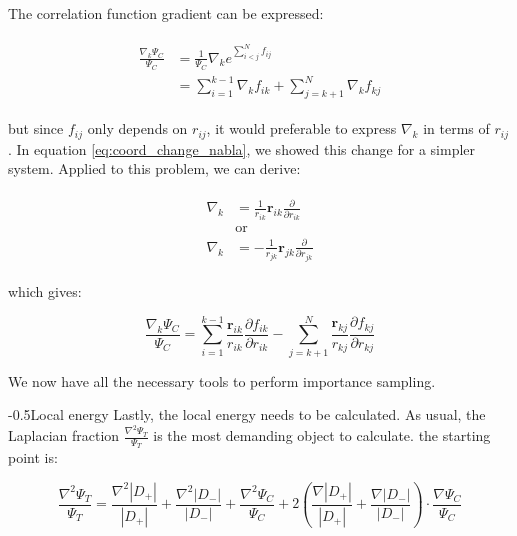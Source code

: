 \documentclass[english, a4paper]{article}
\makeatletter
\renewcommand{\subsubsection}{\@startsection{subsubsection}{3}{0pt}%
{-\baselineskip}{0.5\baselineskip}{\bf\large}}
\newcommand{\bm}[1]{\mathbf{#1}}
\makeatother
\begin{document}
The correlation function gradient can be expressed:

\begin{align}
	\begin{split}
	\frac{\nabla_k \Psi_C}{\Psi_C} &= \frac{1}{\Psi_C}\nabla_k e^{\sum_{i<j}^Nf_{ij}}\\
	&= \sum_{i=1}^{k-1}\nabla_kf_{ik} + \sum_{j=k+1}^{N}\nabla_kf_{kj}
	\end{split}
\end{align}

but since $f_{ij}$ only depends on $r_{ij}$, it would preferable to express $\nabla_k$ in terms of $r_{ij}$. In equation \ref{eq:coord_change_nabla}, we showed this change for a simpler system. Applied to this problem, we can derive:

\begin{align}
	\begin{split}
	\nabla_k &=  \frac{1}{r_{ik}}\bm{r}_{ik}\frac{\partial}{\partial r_{ik}}\\
	&\text{or}\\
	\nabla_k &=  -\frac{1}{r_{jk}}\bm{r}_{jk}\frac{\partial}{\partial r_{jk}}
	\end{split}
\end{align}

which gives:

\begin{equation}
	\frac{\nabla_k \Psi_C}{\Psi_C} = \sum_{i=1}^{k-1}\frac{\bm{r}_{ik}}{r_{ik}}\frac{\partial f_{ik}}{\partial r_{ik}} - \sum_{j=k+1}^{N}\frac{\bm{r}_{kj}}{r_{kj}}\frac{\partial f_{kj}}{\partial r_{kj}}
\end{equation}

We now have all the necessary tools to perform importance sampling.

\subsubsection{Local energy}
Lastly, the local energy needs to be calculated. As usual, the Laplacian fraction $\frac{\nabla^2\Psi_T}{\Psi_T}$ is the most demanding object to calculate. the starting point is:

\begin{equation}
	\frac{\nabla^2\Psi_T}{\Psi_T} = \frac{\nabla^2 |D_+|}{|D_+|} + \frac{\nabla^2 |D_-|}{|D_-|} + \frac{\nabla^2 \Psi_C}{\Psi_C} + 2\left( \frac{\nabla |D_+|}{|D_+|} + \frac{\nabla |D_-|}{|D_-|} \right)\cdot\frac{\nabla \Psi_C}{\Psi_C}
\end{equation}
\end{document}
